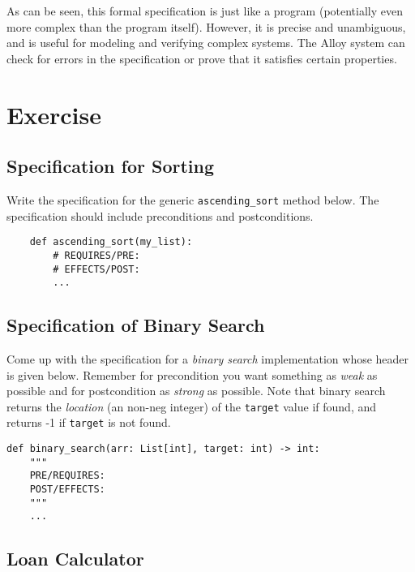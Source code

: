 \documentclass[oneside,11pt,dvipsnames]{book}
\newcommand{\code}[1]{\texttt{#1}}
\begin{document}
As can be seen, this formal specification is just like a program (potentially even more complex than the program itself). However, it is precise and unambiguous, and is useful for modeling and verifying complex systems.  The Alloy system can check for errors in the specification or prove that it satisfies certain properties.

\section{Exercise}

\subsection{Specification for Sorting}\label{exercise:specs-sort}
Write the specification for the generic \code{ascending\_sort} method below. The specification should include preconditions and postconditions.
\begin{lstlisting}
    def ascending_sort(my_list):
        # REQUIRES/PRE: 
        # EFFECTS/POST: 
        ...
\end{lstlisting}
    


\subsection{Specification of Binary Search}\label{exercise:specs-binary-search}

Come up with the specification for a \emph{binary search} implementation whose header is given below. Remember for precondition you want something as \emph{weak} as possible and for postcondition as \emph{strong} as possible. Note that binary search returns the \emph{location} (an non-neg integer) of the \code{target} value if found, and returns -1 if \code{target} is not found. 

\begin{lstlisting}
def binary_search(arr: List[int], target: int) -> int:
    """
    PRE/REQUIRES: 
    POST/EFFECTS: 
    """
    ... 
\end{lstlisting}


\subsection{Loan Calculator}\label{exercise:loan-calculator}    
\end{document}
